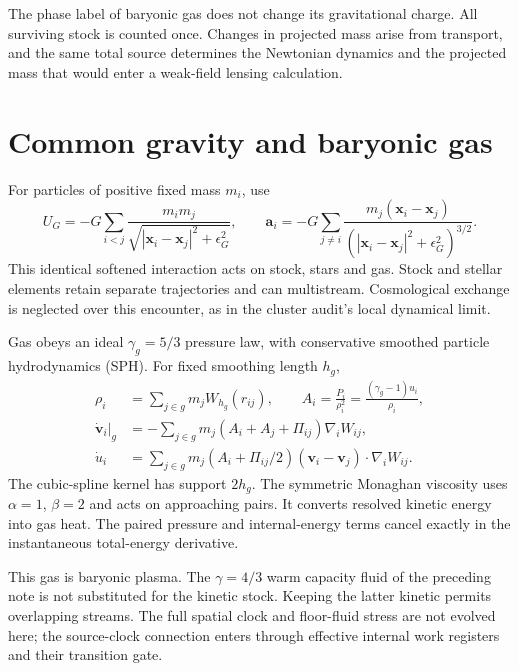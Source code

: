 \documentclass[11pt]{article}
\begin{document}
The phase label of baryonic gas does not change its gravitational charge.
All surviving stock is counted once. Changes in projected mass arise from
transport, and the same total source determines the Newtonian dynamics and
the projected mass that would enter a weak-field lensing calculation.

\section{Common gravity and baryonic gas}
For particles of positive fixed mass $m_i$, use
\begin{equation}
 U_G=-G\sum_{i<j}\frac{m_i m_j}{\sqrt{|\mathbf x_i-\mathbf x_j|^2+\epsilon_G^2}},
 \qquad
 \mathbf a_i=-G\sum_{j\ne i}
 \frac{m_j(\mathbf x_i-\mathbf x_j)}{(|\mathbf x_i-\mathbf x_j|^2+\epsilon_G^2)^{3/2}}.
\end{equation}
This identical softened interaction acts on stock, stars and gas. Stock and
stellar elements retain separate trajectories and can multistream.
Cosmological exchange is neglected over this encounter, as in the cluster
audit's local dynamical limit.

Gas obeys an ideal $\gamma_g=5/3$ pressure law, with conservative smoothed
particle hydrodynamics (SPH)\cite{Cossins}. For fixed smoothing length $h_g$,
\begin{align}
 \rho_i&=\sum_{j\in g}m_jW_{h_g}(r_{ij}),\qquad
 A_i=\frac{P_i}{\rho_i^2}=\frac{(\gamma_g-1)u_i}{\rho_i},\\
 \dot{\mathbf v}_i\big|_g
 &=-\sum_{j\in g}m_j(A_i+A_j+\Pi_{ij})\nabla_iW_{ij},\\
 \dot u_i&=\sum_{j\in g}m_j(A_i+\Pi_{ij}/2)
 (\mathbf v_i-\mathbf v_j)\cdot\nabla_iW_{ij}.
\end{align}
The cubic-spline kernel has support $2h_g$. The symmetric Monaghan viscosity
uses $\alpha=1$, $\beta=2$ and acts on approaching pairs. It converts resolved
kinetic energy into gas heat. The paired pressure and internal-energy terms
cancel exactly in the instantaneous total-energy derivative.

This gas is baryonic plasma. The $\gamma=4/3$ warm capacity fluid of the
preceding note is not substituted for the kinetic stock. Keeping the latter
kinetic permits overlapping streams. The full spatial clock and floor-fluid
stress are not evolved here; the source-clock connection enters through
effective internal work registers and their transition gate.
\end{document}
